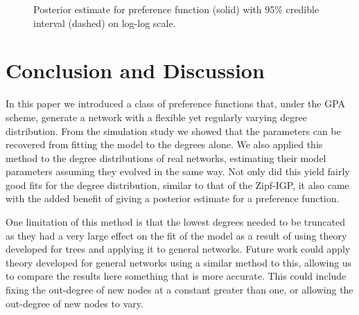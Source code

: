 \documentclass[
  sn-basic,
]{sn-jnl}
\theoremstyle{plain}
\theoremstyle{plain}
\theoremstyle{remark}
\begin{document}
\begin{figure}


\caption{\label{fig-pa}Posterior estimate for preference function
(solid) with 95\% credible interval (dashed) on log-log scale.}

\end{figure}%

\newpage

\section{Conclusion and Discussion}\label{sec-conc}

In this paper we introduced a class of preference functions that, under
the GPA scheme, generate a network with a flexible yet regularly varying
degree distribution. From the simulation study we showed that the
parameters can be recovered from fitting the model to the degrees alone.
We also applied this method to the degree distributions of real
networks, estimating their model parameters assuming they evolved in the
same way. Not only did this yield fairly good fits for the degree
distribution, similar to that of the Zipf-IGP, it also came with the
added benefit of giving a posterior estimate for a preference function.

One limitation of this method is that the lowest degrees needed to be
truncated as they had a very large effect on the fit of the model as a
result of using theory developed for trees and applying it to general
networks. Future work could apply theory developed for general networks
using a similar method to this, allowing us to compare the results here
something that is more accurate. This could include fixing the
out-degree of new nodes at a constant greater than one, or allowing the
out-degree of new nodes to vary.
\end{document}
